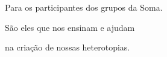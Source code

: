 



\chapter*{}
\thispagestyle{empty}
\begin{vplace}[30]
\begin{flushright}
Para os participantes dos grupos da Soma.

São eles que nos ensinam e ajudam

na criação de nossas heterotopias.
\end{flushright}
\end{vplace}






